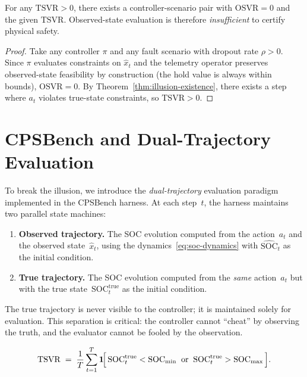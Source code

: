 \begin{proposition}
\label{prop:obs-eval-insufficient}
For any $\mathrm{TSVR} > 0$, there exists a controller-scenario pair
with $\mathrm{OSVR} = 0$ and the given $\mathrm{TSVR}$.  Observed-state
evaluation is therefore \emph{insufficient} to certify physical safety.
\end{proposition}

\begin{proof}
Take any controller $\pi$ and any fault scenario with dropout rate
$\rho > 0$.  Since $\pi$ evaluates constraints on $\hat{x}_t$ and the
telemetry operator preserves observed-state feasibility by construction
(the hold value is always within bounds), $\mathrm{OSVR} = 0$.  By
Theorem~\ref{thm:illusion-existence}, there exists a step where $a_t$
violates true-state constraints, so $\mathrm{TSVR} > 0$.
\end{proof}

\section{CPSBench and Dual-Trajectory Evaluation}
\label{sec:cpsbench-dual}

To break the illusion, we introduce the \emph{dual-trajectory} evaluation
paradigm implemented in the CPSBench harness.  At each step~$t$, the
harness maintains two parallel state machines:

\begin{enumerate}
  \item \textbf{Observed trajectory.}  The SOC evolution computed from
    the action~$a_t$ and the observed state~$\hat{x}_t$, using the
    dynamics~\eqref{eq:soc-dynamics} with $\widehat{\mathrm{SOC}}_t$ as
    the initial condition.
  \item \textbf{True trajectory.}  The SOC evolution computed from the
    \emph{same} action~$a_t$ but with the true
    state~$\mathrm{SOC}_t^{\mathrm{true}}$ as the initial condition.
\end{enumerate}

The true trajectory is never visible to the controller; it is maintained
solely for evaluation.  This separation is critical: the controller
cannot ``cheat'' by observing the truth, and the evaluator cannot be
fooled by the observation.

\begin{definition}
\label{def:tsvr}
\[
  \mathrm{TSVR} \;=\; \frac{1}{T} \sum_{t=1}^{T}
  \mathbf{1}\!\Bigl[\,
    \mathrm{SOC}_{t}^{\mathrm{true}} < \mathrm{SOC}_{\min}
    \;\;\text{or}\;\;
    \mathrm{SOC}_{t}^{\mathrm{true}} > \mathrm{SOC}_{\max}
  \,\Bigr].
\]
\end{definition}

